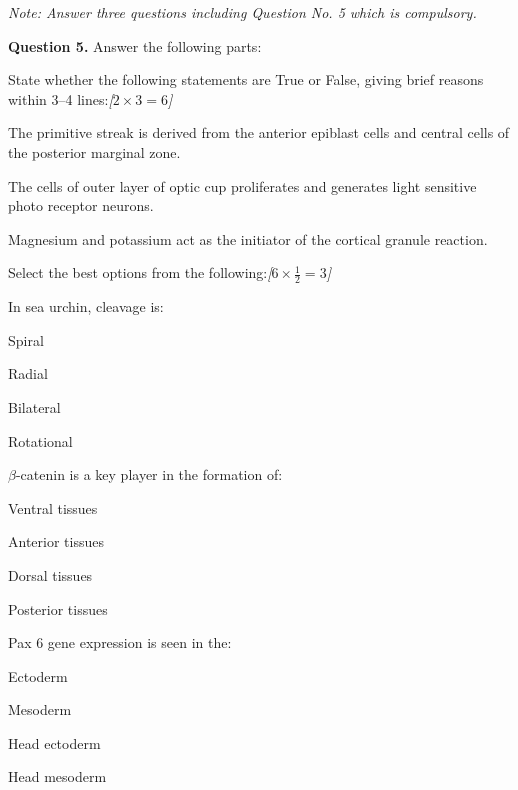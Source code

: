 \documentclass[11pt,a4paper]{article}
\newcommand{\pts}[1]{\hfill   \textit{[#1]}}
\begin{document}
\noindent   \textit{Note: Answer three questions including Question No. 5 which is compulsory.}

\medskip


\noindent   \textbf{Question 5.} Answer the following parts:

\begin{parts}
  \item State whether the following statements are True or False, giving brief reasons within 3--4 lines:\pts{$2  \times 3 = 6$}
  
\begin{parts}
    \item The primitive streak is derived from the anterior epiblast cells and central cells of the posterior marginal zone.
    \item The cells of outer layer of optic cup proliferates and generates light sensitive photo receptor neurons.
    \item Magnesium and potassium act as the initiator of the cortical granule reaction.
  \end{parts}

  \item Select the best options from the following:\pts{$6  \times \frac{1}{2} = 3$}
  
\begin{parts}
    \item In sea urchin, cleavage is:
    
\begin{parts}
      \item Spiral
      \item Radial
      \item Bilateral
      \item Rotational
    \end{parts}

    \item $\beta$-catenin is a key player in the formation of:
    
\begin{parts}
      \item Ventral tissues
      \item Anterior tissues
      \item Dorsal tissues
      \item Posterior tissues
    \end{parts}

    \item Pax 6 gene expression is seen in the:
    
\begin{parts}
      \item Ectoderm
      \item Mesoderm
      \item Head ectoderm
      \item Head mesoderm
    \end{parts}


\end{parts}
\end{parts}
\end{document}

